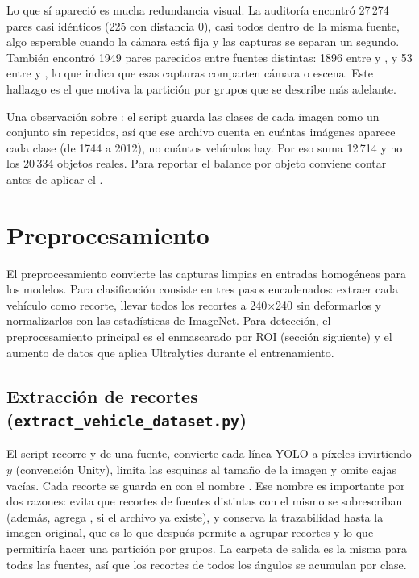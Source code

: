 \documentclass[11pt,a4paper]{article}
\begin{document}
Lo que sí apareció es mucha redundancia visual. La auditoría encontró 27\,274 pares casi idénticos (225 con distancia 0), casi todos dentro de la misma fuente, algo esperable cuando la cámara está fija y las capturas se separan un segundo. También encontró 1949 pares parecidos entre fuentes distintas: 1896 entre  y , y 53 entre  y , lo que indica que esas capturas comparten cámara o escena. Este hallazgo es el que motiva la partición por grupos que se describe más adelante.

Una observación sobre : el script guarda las clases de cada imagen como un conjunto sin repetidos, así que ese archivo cuenta en cuántas imágenes aparece cada clase (de 1744 a 2012), no cuántos vehículos hay. Por eso suma 12\,714 y no los 20\,334 objetos reales. Para reportar el balance por objeto conviene contar  antes de aplicar el .

\section{Preprocesamiento}

El preprocesamiento convierte las capturas limpias en entradas homogéneas para los modelos. Para clasificación consiste en tres pasos encadenados: extraer cada vehículo como recorte, llevar todos los recortes a 240$\times$240 sin deformarlos y normalizarlos con las estadísticas de ImageNet. Para detección, el preprocesamiento principal es el enmascarado por ROI (sección siguiente) y el aumento de datos que aplica Ultralytics durante el entrenamiento.

\subsection{Extracción de recortes (\texorpdfstring{\texttt{extract\_vehicle\_dataset.py}}{extract\_vehicle\_dataset.py})}

El script recorre  y  de una fuente, convierte cada línea YOLO a píxeles invirtiendo $y$ (convención Unity), limita las esquinas al tamaño de la imagen y omite cajas vacías. Cada recorte se guarda en  con el nombre . Ese nombre es importante por dos razones: evita que recortes de fuentes distintas con el mismo  se sobrescriban (además,  agrega ,  si el archivo ya existe), y conserva la trazabilidad hasta la imagen original, que es lo que después permite a  agrupar recortes y lo que permitiría hacer una partición por grupos. La carpeta de salida es la misma para todas las fuentes, así que los recortes de todos los ángulos se acumulan por clase.
\end{document}
